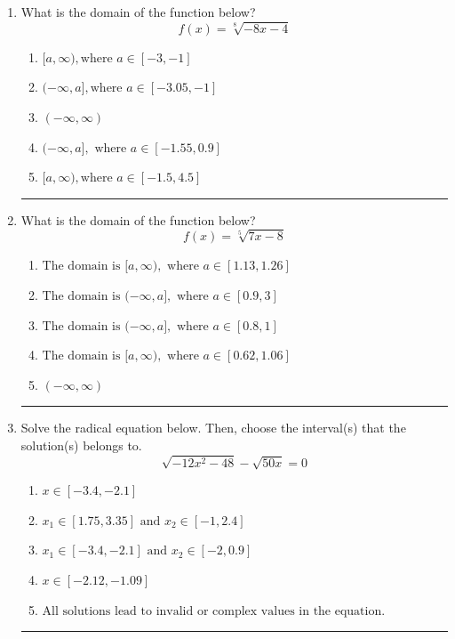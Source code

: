 \documentclass[14pt]{extbook}
\newcommand{\litem}[1]{\item#1\hspace*{-1cm}\rule{\textwidth}{0.4pt}}
\begin{document}
\begin{enumerate}
{\begin{enumerate}[label=\Alph*.]
\end{enumerate} }
\litem{
What is the domain of the function below?\[ f(x) = \sqrt[8]{-8 x - 4} \]\begin{enumerate}[label=\Alph*.]
\item \( [a, \infty), \text{where } a \in [-3, -1] \)
\item \( (-\infty, a], \text{where } a \in [-3.05, -1] \)
\item \( (-\infty, \infty) \)
\item \( (-\infty, a], \text{ where } a \in [-1.55, 0.9] \)
\item \( [a, \infty), \text{where } a \in [-1.5, 4.5] \)

\end{enumerate} }
\litem{
What is the domain of the function below?\[ f(x) = \sqrt[5]{7 x - 8} \]\begin{enumerate}[label=\Alph*.]
\item \( \text{The domain is } [a, \infty), \text{   where } a \in [1.13, 1.26] \)
\item \( \text{The domain is } (-\infty, a], \text{   where } a \in [0.9, 3] \)
\item \( \text{The domain is } (-\infty, a], \text{   where } a \in [0.8, 1] \)
\item \( \text{The domain is } [a, \infty), \text{   where } a \in [0.62, 1.06] \)
\item \( (-\infty, \infty) \)

\end{enumerate} }
\litem{
Solve the radical equation below. Then, choose the interval(s) that the solution(s) belongs to.\[ \sqrt{-12 x^2 - 48} - \sqrt{50 x} = 0 \]\begin{enumerate}[label=\Alph*.]
\item \( x \in [-3.4,-2.1] \)
\item \( x_1 \in [1.75, 3.35] \text{ and } x_2 \in [-1,2.4] \)
\item \( x_1 \in [-3.4, -2.1] \text{ and } x_2 \in [-2,0.9] \)
\item \( x \in [-2.12,-1.09] \)
\item \( \text{All solutions lead to invalid or complex values in the equation.} \)


\end{enumerate}}
\end{enumerate}
\end{document}
